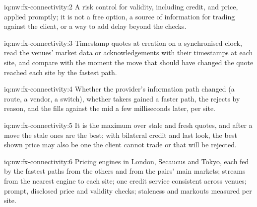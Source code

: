 \begin{solution}{iq:nw:fx-connectivity:2}
A risk control for validity, including credit, and price, applied promptly; it is not a free option, a source of information for trading
against the client, or a way to add delay beyond the checks.
\end{solution}

\begin{solution}{iq:nw:fx-connectivity:3}
Timestamp quotes at creation on a synchronised clock, read the venues' market data or acknowledgements with their timestamps at each site,
and compare with the moment the move that should have changed the quote reached each site by the fastest path.
\end{solution}

\begin{solution}{iq:nw:fx-connectivity:4}
Whether the provider's information path changed (a route, a vendor, a switch), whether takers gained a faster path, the rejects by reason,
and the fills against the mid a few milliseconds later, per site.
\end{solution}

\begin{solution}{iq:nw:fx-connectivity:5}
It is the maximum over stale and fresh quotes, and after a move the stale ones are the best; with bilateral credit and last look, the best
shown price may also be one the client cannot trade or that will be rejected.
\end{solution}

\begin{solution}{iq:nw:fx-connectivity:6}
Pricing engines in London, Secaucus and Tokyo, each fed by the fastest paths from the others and from the pairs' main markets; streams from
the nearest engine to each site; one credit service consistent across venues; prompt, disclosed price and validity checks; staleness and
markouts measured per site.
\end{solution}
